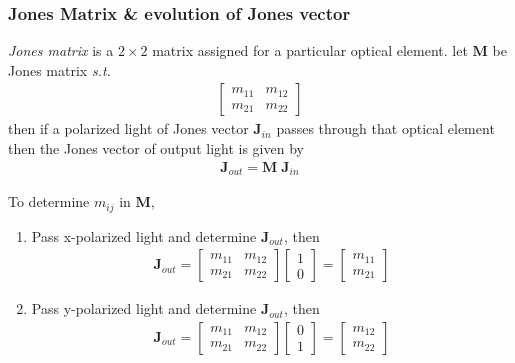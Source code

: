 \documentclass[11pt,a4paper]{article}
\begin{document}
\subsubsection{Jones Matrix \& evolution of Jones vector}
\textit{Jones matrix} is a $2\times2$ matrix assigned for a particular optical element. let $\textbf{M}$ be Jones matrix \textit{s.t.} 
\begin{align}
	\begin{bmatrix}
		m_{11} & m_{12}\\
		m_{21} & m_{22}
	\end{bmatrix}
\end{align}
then if a polarized light of Jones vector $\textbf{J}_{in}$ passes through that optical element then the Jones vector of output light is given by 
\begin{align}
	\textbf{J}_{out}=\textbf{M}\;\textbf{J}_{in}
\end{align}

To determine $m_{ij}$ in $\textbf{M}$,
\begin{enumerate}
	\item Pass x-polarized light and determine $\textbf{J}_{out}$, then 
	\begin{align}
		\textbf{J}_{out}=
		\begin{bmatrix}
			m_{11} & m_{12}\\
			m_{21} & m_{22}
		\end{bmatrix}
		\begin{bmatrix}
			1\\
			0
		\end{bmatrix}=
	\begin{bmatrix}
		m_{11}\\
		m_{21}
	\end{bmatrix}
	\end{align}

\item Pass y-polarized light and determine $\textbf{J}_{out}$, then 
\begin{align}
	\textbf{J}_{out}=
	\begin{bmatrix}
		m_{11} & m_{12}\\
		m_{21} & m_{22}
	\end{bmatrix}
	\begin{bmatrix}
		0\\
		1
	\end{bmatrix}=
	\begin{bmatrix}
		m_{12}\\
		m_{22}
	\end{bmatrix}
\end{align}
\end{enumerate}
\end{document}
